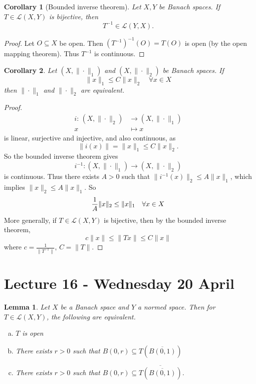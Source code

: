 \documentclass[10pt, oneside, reqno]{amsart}
\theoremstyle{plain}%
\newtheorem{lem}[thm]{Lemma}
\newtheorem*{cor}{Corollary}
\theoremstyle{definition}
\theoremstyle{remark}
\newcommand{\mapping}[5]{\begin{align*}
	#1 : \,     #2 &\rightarrow #3 \\
			#4  &\mapsto #5
\end{align*}	
}
\begin{document}
\begin{cor}[Bounded inverse theorem]
	Let $X, Y$ be Banach spaces.  If $T \in \mathcal L(X,Y)$ is bijective, then \[
		T^{-1} \in \mathcal L(Y,X).
	\]
	
\end{cor}
\begin{proof}
	Let $O \subseteq X$ be open.  Then $(T^{-1})^{-1}(O) = T(O)$ is open (by the open mapping theorem).  Thus $T^{-1}$ is continuous.
\end{proof}

\begin{cor}
	Let $(X, \| \cdot \|_1)$ and $(X, \| \cdot \|_2)$ be Banach spaces.  If \[
		\| x \|_1 \leq C \| x \|_2 \quad \forall x \in X
	\] then $\| \cdot \|_1$ and $\| \cdot \|_2$ are equivalent.  
\end{cor}
\begin{proof}
	\mapping{i}{(X, \| \cdot \|_2)}{(X, \| \cdot \|_1)}{ x}{x} is linear, surjective and injective, and also continuous, as \[
		\|i(x) \| = \| x \|_1 \leq C \| x \|_2.
	\]  So the bounded inverse theorem gives \[
		i^{-1} : (X, \| \cdot \|_1) \rightarrow (X, \| \cdot \|_2)
	\] is continuous.  Thus there exists $A > 0$ such that $\| i^{-1}(x)\|_2 \leq A \| x \|_1$, which implies $\| x \|_2 \leq A \| x \|_1$.  So \[
		\frac{1}{A} \| x \|_2 \leq \| x \|_1 \quad \forall x \in X \qedhere
	\]  More generally, if $T \in \mathcal L(X,Y)$ is bijective, then by the bounded inverse theorem, \[
		c \| x \| \leq \| Tx \| \leq C \| x \|
	\] where $c  = \frac{1}{ \| T^{-1} \|}$, $C = \| T \|$.  
\end{proof} 

\section{Lecture 16 - Wednesday 20 April} %
\label{sec:lecture_16_wednesday_20_april}


\begin{lem}
	Let $X$ be a Banach space and $Y$ a normed space.  Then for $T \in \mathcal L(X, Y)$, the following are equivalent.
	\begin{enumerate}[(a)]
		\item $T$ is open
		\item There exists $r > 0$ such that $B(0, r) \subseteq T(\overline{B(0, 1)})$
		\item There exists $r > 0$ such that $B(0, r) \subseteq \overline{T(\overline{B(0, 1)})}$.
	\end{enumerate} 
\end{lem}
\end{document}

